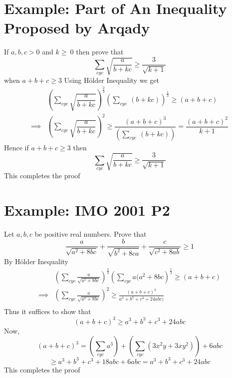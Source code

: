 \documentclass[12pt]{article}
\begin{document}
\section{Example: Part of An Inequality Proposed by Arqady}
If $a,b,c>0$ and $k \geq\ 0$ then prove that $$ \sum \limits_{cyc}\sqrt{\dfrac{a}{b+kc}}\geq \frac{3}{\sqrt{k+1}} $$ when $a+b+c\geq 3$
Using H\"{o}lder Inequality we get 
\begin{align*}
& \left(\sum \limits_{cyc}\sqrt{\dfrac{a}{b+kc}} \right)^{\frac{2}{3}}\left(\sum \limits_{cyc}\ (b+kc)\right)^{\frac{1}{3}}\geq (a+b+c)\\
\implies &\left(\sum \limits_{cyc}\sqrt{\dfrac{a}{b+kc}} \right)^2 \geq \dfrac{(a+b+c)^3}{\left(\sum \limits_{cyc}\ (b+kc)\right)}=\dfrac{(a+b+c)^2}{k+1}
\end{align*}Hence if $a+b+c\geq 3$ then $$\sum \limits_{cyc}\sqrt{\dfrac{a}{b+kc}}\geq \dfrac{3}{\sqrt{k+1}}$$This completes the proof

\pagebreak

\section{Example: IMO 2001 P2}
Let $a,b,c$ be positive real numbers. Prove that$$\frac{a}{\sqrt{a^2+8bc}}+\frac{b}{\sqrt{b^2+8ca}}+\frac{c}{\sqrt{c^2+8ab}}\geq 1$$
By H\"{o}lder Inequality
\begin{align*}
& \left(\sum_{cyc}\frac{a}{\sqrt{a^2+8bc}}\right)^{\frac{2}{3}}\left(\sum_{cyc}a(a^2+8bc\right)^{\frac{1}{3}}\geq (a+b+c)\\
\implies & \left(\sum_{cyc}\frac{a}{\sqrt{a^2+8bc}}\right)^2\geq \frac{(a+b+c)^3}{a^3+b^3+c^3+24abc)}\\
\end{align*}
Thus it suffices to show that
$$(a+b+c)^{3}\ge a^{3}+b^{3}+c^{3}+24abc$$
Now,$$(a+b+c)^3=\left(\sum_{cyc}a^3 \right)+\left(\sum_{cyc}(3x^2y+3xy^2)\right) +6abc$$ $$\geq a^3+b^3+c^3+18abc+6abc =a^3+b^3+c^3+24abc$$
This completes the proof
\end{document}
